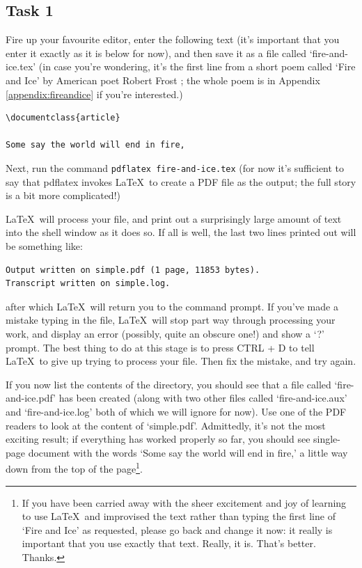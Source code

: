 \begin{refsection}
\subsection{Task 1}
\label{sec:task-1}


Fire up your favourite editor, enter the following text (it's important that you enter it exactly as it is below for now), and then save it as a file called `fire-and-ice.tex' (in case you're wondering, it's the first line from a short poem called `Fire and Ice' by American poet Robert Frost \citep{frost1923}; the whole poem is in Appendix \ref{appendix:fireandice} if you're interested.)

\begin{verbatim}
\documentclass{article}

Some say the world will end in fire,

\end{verbatim}
%
Next, run the command \texttt{pdflatex fire-and-ice.tex} (for now it's sufficient to say that pdflatex invokes \LaTeX\ to create a PDF file as the output; the full story is a bit more complicated!)

\LaTeX\ will process your file, and print out a surprisingly large amount of text into the shell window as it does so. If all is well, the last two lines printed out will be something like:

\begin{verbatim}
Output written on simple.pdf (1 page, 11853 bytes).
Transcript written on simple.log.
\end{verbatim}
%
after which \LaTeX\ will return you to the command prompt. If you've made a mistake typing in the file, \LaTeX\ will stop part way through processing your work, and display an error (possibly, quite an obscure one!) and show a `?' prompt. The best thing to do at this stage is to press CTRL + D to tell \LaTeX\ to give up trying to process your file. Then fix the mistake, and try again.  

If you now list the contents of the directory, you should see that a file called `fire-and-ice.pdf' has been created (along with two other files called `fire-and-ice.aux' and `fire-and-ice.log' both of which we will ignore for now). Use one of the PDF readers to look at the content of `simple.pdf'.  Admittedly, it's not the most exciting result; if everything has worked properly so far, you should see single-page document with the words `Some say the world will end in fire,' a little way down from the top of the page\footnote{If you have been carried away with the sheer excitement and joy of learning to use \LaTeX\, and improvised the text rather than typing the first line of `Fire and Ice' as requested, please go back and change it now: it really is important that you use exactly that text. Really, it is. That's better. Thanks.}.


\end{refsection}
